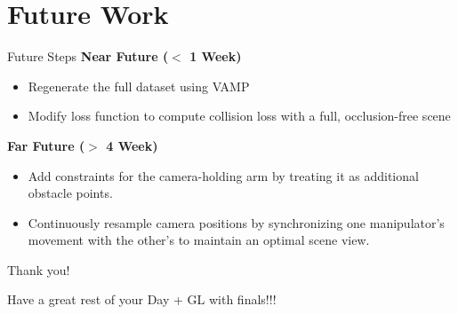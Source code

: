 \documentclass{beamer}
\begin{document}
\section{Future Work}
\begin{frame}[t]{Future Steps}
    \textbf{Near Future ($<$ 1 Week)}
    \begin{itemize}[label=-]
        \item Regenerate the full dataset using VAMP
        \item Modify loss function to compute collision loss with a full, occlusion-free scene
    \end{itemize}
    \textbf{Far Future ($>$ 4 Week)}
    \begin{itemize}[label=-]
        \item Add constraints for the camera-holding arm by treating it as additional obstacle points.
        \item Continuously resample camera positions by synchronizing one manipulator's movement with the other's to maintain an optimal scene view. 
    \end{itemize}
\end{frame}
\begin{frame}{Thank you!}
	\begin{center}
        Have a great rest of your Day + GL with finals!!!
	\end{center}
	\begin{center}
	\end{center}
\end{frame}
\end{document}
